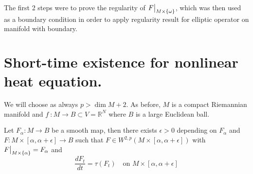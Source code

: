 \begin{remark}
The first 2 steps were to prove the regularity of \(\restr{F}{M\times
\{\omega\}}\), which was then used as a boundary condition in
order to apply regularity result for elliptic operator on manifold with boundary.
\end{remark}




\section{Short-time existence for nonlinear heat equation.}
\label{sec:org5d82ff9}
We will choose as always \(p > \dim M +2\). As before, \(M\) is a compact Riemannian
manifold and \(f\ : M \longrightarrow B \subset V = \mathbb{R}^N\) where \(B\) is a
large Euclidean ball.

\begin{theorem}
\label{thm:short-time}
Let \(F_\alpha: M \longrightarrow  B\) be a smooth map, then there exists \(\epsilon>0\) depending on \(F_\alpha\) and \(F: M\times [\alpha,\alpha + \epsilon] \longrightarrow
B\) such that \(F\in W^{2,p}(M\times [\alpha,\alpha+\epsilon])\) with \(\restr{F}{M\times \{\alpha\}} = F_\alpha\) and
\[
 \frac{d F_t}{dt} = \tau(F_t) \quad \text{on } M\times [\alpha,\alpha +\epsilon]
\]
\end{theorem}

